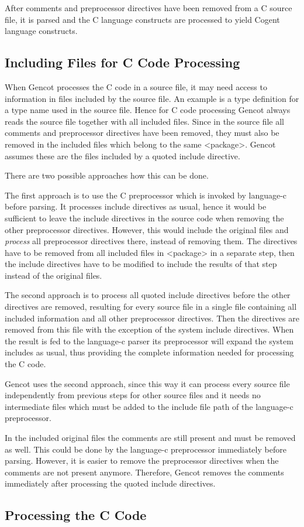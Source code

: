 
After comments and preprocessor directives have been removed from a C source file, it is parsed and
the C language constructs are processed to yield Cogent language constructs. 

\subsection{Including Files for C Code Processing}

When Gencot processes the C code in a source file, it may need access to information in files included by
the source file. An example is a type definition for a type name used in the source file. Hence for
C code processing Gencot always reads the source file together with all included files. Since in the source
file all comments and preprocessor directives have been  removed, they must also be removed in the included files
which belong to the same <package>. Gencot assumes these are the files included by a quoted include directive.

There are two possible approaches how this can be done.

The first approach is to use the C preprocessor which is invoked by language-c before parsing. It processes
include directives as usual, hence it would be sufficient to leave the include directives in the source code
when removing the other preprocessor directives. However, this would include the original  files and
\textit{process} all preprocessor directives there, instead of removing them. The directives have to be 
removed from all included files in <package> in a separate step, then the include directives have to be modified to include
the results of that step instead of the original files.

The second approach is to process all quoted include directives before the other directives are removed, 
resulting for every source
file in a single file containing all included information and all other preprocessor directives. Then the directives
are removed from this file with the exception of the system include directives. When the result is fed to the 
language-c parser its preprocessor will expand the system includes as usual, thus providing the complete 
information needed for processing the C code.

Gencot uses the second approach, since this way it can process every source file independently from previous steps for 
other source files and it needs no intermediate files which must be added to the include file path of the language-c
preprocessor.

In the included original files the comments are still present and must be removed as well. This could be done 
by the language-c preprocessor immediately before parsing. However, it is easier to remove the preprocessor
directives when the comments are not present anymore. Therefore, Gencot removes the comments immediately after
processing the quoted include directives.

\subsection{Processing the C Code}



 
